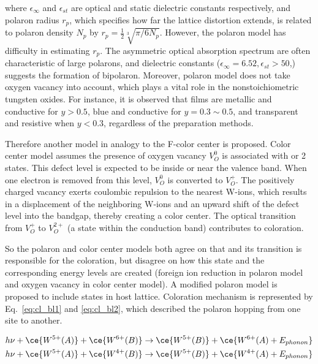 where $\epsilon_\infty$ and $\epsilon_{st}$ are optical and static dielectric constants respectively, and polaron radius $r_p$, which specifies how far the lattice distortion extends, is related to polaron density $N_p$ by $r_p = \frac{1}{2}\sqrt[3]{\pi/6N_p}$. However, the polaron model has difficulty in estimating $r_p$. The asymmetric optical absorption spectrum are often characteristic of large polarons, and dielectric constants ($\epsilon_\infty = 6.52,\epsilon_{st} > 50$,\cite{Deb2008}) suggests the formation of bipolaron. Moreover, polaron model does not take oxygen vacancy into account, which plays a vital role in the nonstoichiometric tungsten oxides. For instance, it is observed that  films are metallic and conductive for $y > 0.5$, blue and conductive for $y = 0.3 \sim 0.5$, and transparent and resistive when $y < 0.3$, regardless of the preparation methods.\cite{Chatten2005}

Therefore another model in analogy to the F-color center is proposed. Color center model assumes the presence of oxygen vacancy $V_O^0$ is associated with  or 2 states. This defect level is expected to be inside or near the valence band. When one electron is removed from this level, $V_O^0$ is converted to $V_O^+$. The positively charged vacancy exerts coulombic repulsion to the nearest W-ions, which results in a displacement of the neighboring W-ions and an upward shift of the defect level into the bandgap, thereby creating a color center. The optical transition from $V_O^+$ to $V_O^{2+}$ (a state within the conduction band)
contributes to coloration.\cite{Deb2008}

So the polaron and color center models both agree on that  and its transition is responsible for the coloration, but disagree on how this  state and the corresponding energy levels are created (foreign ion reduction in polaron model and oxygen vacancy in color center model). A modified polaron model is proposed to include  states in host lattice. Coloration mechanism is represented by Eq.~\ref{eq:cl_bl1} and \ref{eq:cl_bl2}, which described the polaron hopping from one site to another.\cite{Chatten2005}

\begin{align}
h\nu +\ce{W^{5+}(A)} +  \ce{W^{6+}(B)} &\rightarrow \ce{W^{5+}(B)} + \ce{W^{6+}(A) + E_{phonon}} \label{eq:cl_bl1}\\
h\nu +\ce{W^{5+}(A)} +  \ce{W^{4+}(B)} &\rightarrow \ce{W^{5+}(B)} + \ce{W^{4+}(A) + E_{phonon}} \label{eq:cl_bl2}
\end{align}

